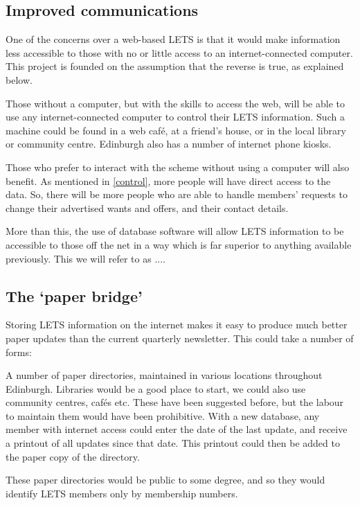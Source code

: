 \documentclass[a4paper,11pt]{article}
\begin{document}
\subsection{Improved communications}

One of the concerns over a web-based LETS is that it would make information less accessible to those with no or little access to an internet-connected computer. This project is founded on the assumption that the reverse is true, as explained below.

Those without a computer, but with the skills to access the web, will be able to use any internet-connected computer to control their LETS information. Such a machine could be found in a web caf\'e, at a friend's house, or in the local library or community centre. Edinburgh also has a number of internet phone kiosks.

Those who prefer to interact with the scheme without using a computer will also benefit. As mentioned in \ref{control}, more people will have direct access to the data. So, there will be more people who are able to handle members' requests to change their advertised wants and offers, and their contact details.

More than this, the use of database software will allow LETS information to be accessible to those off the net in a way which is far superior to anything available previously. This we will refer to as ....

\subsection{The `paper bridge'}

Storing LETS information on the internet makes it easy to produce much better paper updates than the current quarterly newsletter. This could take a number of forms:

A number of paper directories, maintained in various locations throughout Edinburgh. Libraries would be a good place to start, we could also use community centres, caf\'es etc. These have been suggested before, but the labour to maintain them would have been prohibitive. With a new database, any member with internet access could enter the date of the last update, and receive a printout of all updates since that date. This printout could then be added to the paper copy of the directory.


These paper directories would be public to some degree, and so they would identify LETS members only by membership numbers. 
\end{document}
